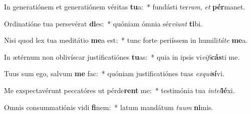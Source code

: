 \item In generatiónem et generatiónem véritas \textbf{tu}a:~* fundásti ter\textit{ram}, \textit{et} \textbf{pér}manet.
\item Ordinatióne tua persevérat \textbf{di}es:~* quóniam ómnia sér\textit{vi}\textit{unt} \textbf{ti}bi.
\item Nisi quod lex tua meditátio \textbf{me}a est:~* tunc forte periíssem in humili\textit{tá}\textit{te} \textbf{me}a.
\item In ætérnum non oblivíscar justificatiónes \textbf{tu}as:~* quia in ipsis vi\textit{vi}\textit{fi}\textbf{cás}ti me.
\item Tuus sum ego, salvum \textbf{me} fac:~* quóniam justificatiónes tuas \textit{ex}\textit{qui}\textbf{sí}vi.
\item Me exspectavérunt peccatóres ut pérde\textbf{rent} me:~* testimónia tua \textit{in}\textit{tel}\textbf{lé}xi.
\item Omnis consummatiónis vidi \textbf{fi}nem:~* latum mandátum \textit{tu}\textit{um} \textbf{ni}mis.
